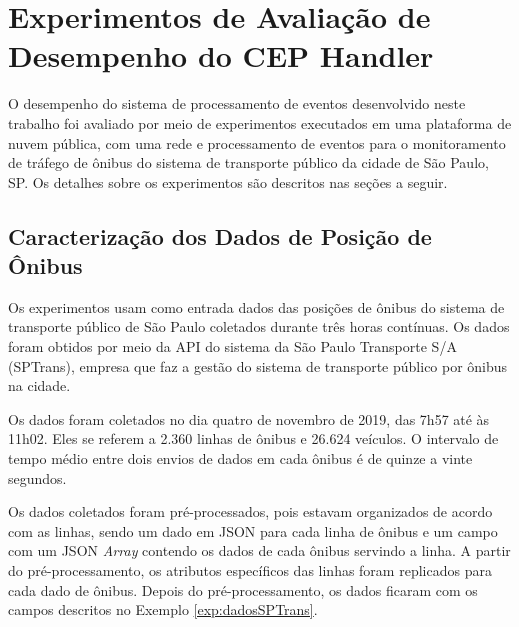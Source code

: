 \chapter{Experimentos de Avaliação de Desempenho do CEP Handler}
\label{cap:experimento}

O desempenho do sistema de processamento de eventos desenvolvido neste trabalho foi avaliado por meio de experimentos executados em uma plataforma de nuvem pública, com uma rede e processamento de eventos para o monitoramento de tráfego de ônibus do sistema de transporte público da cidade de São Paulo, SP. Os detalhes sobre os experimentos são descritos nas seções a seguir.

\section{Caracterização dos Dados de Posição de Ônibus}

Os experimentos usam como entrada dados das posições de ônibus do sistema de transporte público de São Paulo coletados durante três horas contínuas. Os dados foram obtidos por meio da API do sistema \cite{Olhovivo} da São Paulo Transporte S/A (SPTrans), empresa que faz a gestão do sistema de transporte público por ônibus na cidade.

Os dados foram coletados no dia quatro de novembro de 2019, das 7h57 até às 11h02. Eles se referem a 2.360 linhas de ônibus e 26.624 veículos. O intervalo de tempo médio entre dois envios de dados em cada ônibus é de quinze a vinte segundos.

Os dados coletados foram pré-processados, pois estavam organizados de acordo com as linhas, sendo um dado em JSON para cada linha de ônibus e um campo com um JSON \textit{Array} contendo os dados de cada ônibus servindo a linha. A partir do pré-processamento, os atributos específicos das linhas foram replicados para cada dado de ônibus.
Depois do pré-processamento, os dados ficaram com os campos descritos no Exemplo \ref{exp:dadosSPTrans}.

